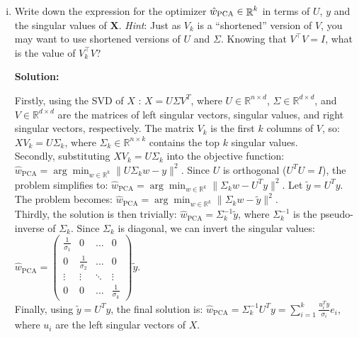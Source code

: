 \documentclass{article}
\DeclareMathOperator{\R}{\mathbb{R}}
\newcommand{\mat}[1]{\mathbf{#1}}
\newenvironment{solution}{\color{blue} \smallskip \textbf{Solution:}}{}
\begin{document}
\begin{enumerate}
\begin{enumerate}[(i)]
\item Write down the expression for the optimizer $\hatwPCA \in \R^k$ in terms of $U$, $y$ and the singular values of $\mat X$. 
\textit{Hint}: Just as $V_k$ is a ``shortened'' version of $V$, you may want to use shortened versions of $U$ and $\Sigma$. Knowing that $V^\top V = I$, what is the value of $V_k^\top V$?

\begin{solution}


Firstly, using the SVD of \(X\) : 
\( X = U \Sigma V^T \),
where \(U \in \mathbb{R}^{n \times d}\), \(\Sigma \in \mathbb{R}^{d \times d}\), and \(V \in \mathbb{R}^{d \times d}\) are the matrices of left singular vectors, singular values, and right singular vectors, respectively. The matrix \(V_k\) is the first \(k\) columns of \(V\), so: 
\( X V_k = U \Sigma_k \),
where \(\Sigma_k \in \mathbb{R}^{n \times k}\) contains the top \(k\) singular values. \\

Secondly, substituting \(X V_k = U \Sigma_k\) into the objective function: 
\( \hat{w}_{\text{PCA}} = \arg \min_{w \in \mathbb{R}^k} \|U \Sigma_k w - y\|^2 \).
Since \(U\) is orthogonal (\(U^T U = I\)), the problem simplifies to: 
\( \hat{w}_{\text{PCA}} = \arg \min_{w \in \mathbb{R}^k} \|\Sigma_k w - U^T y\|^2 \).
Let \(\tilde{y} = U^T y\). The problem becomes: 
\( \hat{w}_{\text{PCA}} = \arg \min_{w \in \mathbb{R}^k} \|\Sigma_k w - \tilde{y}\|^2 \).\\


Thirdly, the solution is then trivially: 
\( \hat{w}_{\text{PCA}} = \Sigma_k^{-1} \tilde{y} \),
where \(\Sigma_k^{-1}\) is the pseudo-inverse of \(\Sigma_k\). Since \(\Sigma_k\) is diagonal, we can invert the singular values: 
\( \hat{w}_{\text{PCA}} = \begin{pmatrix} \frac{1}{\sigma_1} & 0 & \dots & 0 \\ 0 & \frac{1}{\sigma_2} & \dots & 0 \\ \vdots & \vdots & \ddots & \vdots \\ 0 & 0 & \dots & \frac{1}{\sigma_k} \end{pmatrix} \tilde{y} \). \\


Finally, using \(\tilde{y} = U^T y\), the final solution is: 
\( \hat{w}_{\text{PCA}} = \Sigma_k^{-1} U^T y = \sum_{i=1}^{k} \frac{u_i^T y}{\sigma_i} e_i \),
where \(u_i\) are the left singular vectors of \(X\).\\



\end{solution}
\end{enumerate}
\end{enumerate}
\end{document}
